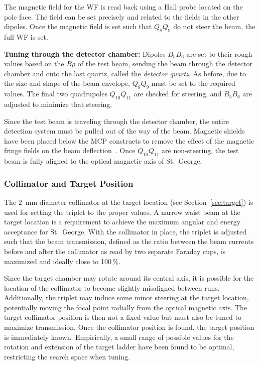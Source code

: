 The magnetic field for the WF is read back using a Hall probe located on
the pole face. The field can be set precisely and related to the fields
in the other dipoles. Once the magnetic field is set such that $Q_8Q_9$
do not steer the beam, the full WF is set.

\textbf{Tuning through the detector chamber:}
Dipoles $B_5B_6$ are set to their rough values based on the $B\rho$ of
the test beam, sending the beam through the detector chamber and onto
the last quartz, called the \emph{detector quartz}. As before, due to
the size and shape of the beam envelope, $Q_8Q_9$ must be set to the
required values. The final two quadrupoles $Q_{10}Q_{11}$ are checked
for steering, and $B_5B_6$ are adjusted to minimize that steering.

Since the test beam is traveling through the detector chamber, the
entire detection system must be pulled out of the way of the beam.
Magnetic shields have been placed below the MCP constructs to remove the
effect of the magnetic fringe fields on the beam
deflection~\cite{MoralesDNP}. Once $Q_{10}Q_{11}$ are non-steering, the
test beam is fully aligned to the optical magnetic axis of St.\ George.

\subsubsection{Collimator and Target Position}

The 2~mm diameter collimator at the target location (see
Section~\ref{sec:target}) is used for setting the triplet to the proper
values. A narrow waist beam at the target location is a requirement to
achieve the maximum angular and energy acceptance for St.\ George. With
the collimator in place, the triplet is adjusted such that the beam
transmission, defined as the ratio between the beam currents before and
after the collimator as read by two separate Faraday cups, is maximized
and ideally close to 100\,\%.

Since the target chamber may rotate around its central axis, it is
possible for the location of the collimator to become slightly
misaligned between runs. Additionally, the triplet may induce some minor
steering at the target location, potentially moving the focal point
radially from the optical magnetic axis. The target collimator position
is then not a fixed value but must also be tuned to maximize
transmission. Once the collimator position is found, the target position
is immediately known. Empirically, a small range of possible values for
the rotation and extension of the target ladder have been found to be
optimal, restricting the search space when tuning.

